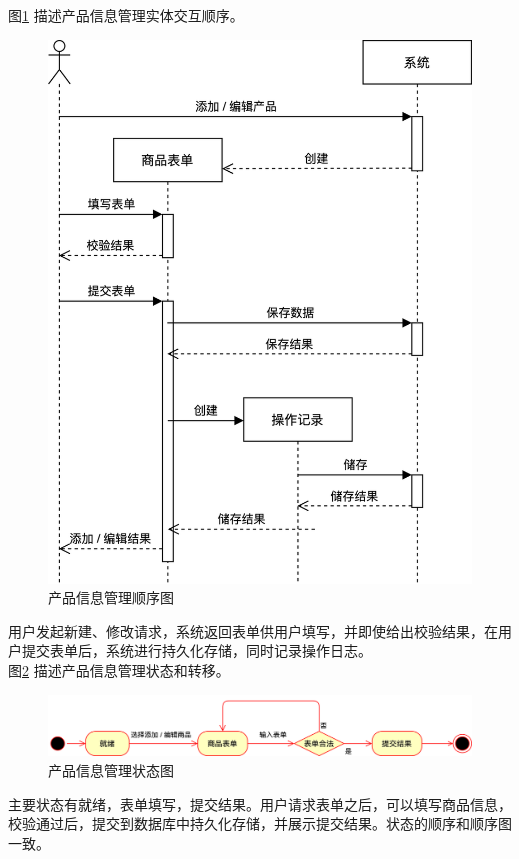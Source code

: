 \documentclass[a4paper]{ctexart}
\begin{document}
图\ref{fig:产品信息管理顺序图} 描述产品信息管理实体交互顺序。
\begin{figure}[H]
\centering
\includegraphics[scale=0.2]{image/4_4顺序图.png}
\caption{产品信息管理顺序图}
\label{fig:产品信息管理顺序图}
\end{figure}
用户发起新建、修改请求，系统返回表单供用户填写，并即使给出校验结果，在用户提交表单后，系统进行持久化存储，同时记录操作日志。\\

图\ref{fig:产品信息管理状态图} 描述产品信息管理状态和转移。
\begin{figure}[H]
\centering
\includegraphics[scale=0.3]{image/4_5状态图.png}
\caption{产品信息管理状态图}
\label{fig:产品信息管理状态图}
\end{figure}
主要状态有就绪，表单填写，提交结果。用户请求表单之后，可以填写商品信息，校验通过后，提交到数据库中持久化存储，并展示提交结果。状态的顺序和顺序图一致。\\
\end{document}

